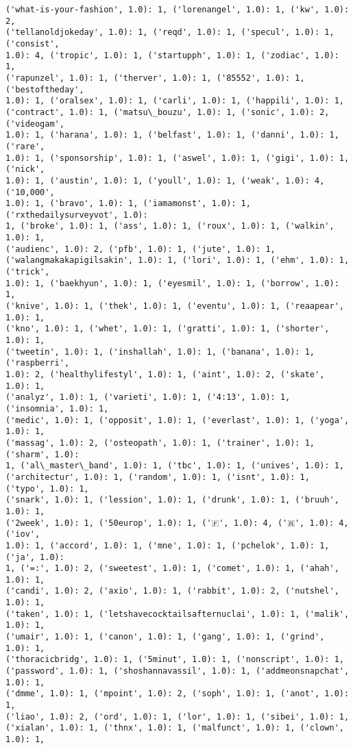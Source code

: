 \documentclass[11pt]{article}
\begin{document}
\begin{Verbatim}[commandchars=\\\{\}]
('what-is-your-fashion', 1.0): 1, ('lorenangel', 1.0): 1, ('kw', 1.0): 2,
('tellanoldjokeday', 1.0): 1, ('reqd', 1.0): 1, ('specul', 1.0): 1, ('consist',
1.0): 4, ('tropic', 1.0): 1, ('startupph', 1.0): 1, ('zodiac', 1.0): 1,
('rapunzel', 1.0): 1, ('therver', 1.0): 1, ('85552', 1.0): 1, ('bestoftheday',
1.0): 1, ('oralsex', 1.0): 1, ('carli', 1.0): 1, ('happili', 1.0): 1,
('contract', 1.0): 1, ('matsu\_bouzu', 1.0): 1, ('sonic', 1.0): 2, ('videogam',
1.0): 1, ('harana', 1.0): 1, ('belfast', 1.0): 1, ('danni', 1.0): 1, ('rare',
1.0): 1, ('sponsorship', 1.0): 1, ('aswel', 1.0): 1, ('gigi', 1.0): 1, ('nick',
1.0): 1, ('austin', 1.0): 1, ('youll', 1.0): 1, ('weak', 1.0): 4, ('10,000',
1.0): 1, ('bravo', 1.0): 1, ('iamamonst', 1.0): 1, ('rxthedailysurveyvot', 1.0):
1, ('broke', 1.0): 1, ('ass', 1.0): 1, ('roux', 1.0): 1, ('walkin', 1.0): 1,
('audienc', 1.0): 2, ('pfb', 1.0): 1, ('jute', 1.0): 1,
('walangmakakapigilsakin', 1.0): 1, ('lori', 1.0): 1, ('ehm', 1.0): 1, ('trick',
1.0): 1, ('baekhyun', 1.0): 1, ('eyesmil', 1.0): 1, ('borrow', 1.0): 1,
('knive', 1.0): 1, ('thek', 1.0): 1, ('eventu', 1.0): 1, ('reaapear', 1.0): 1,
('kno', 1.0): 1, ('whet', 1.0): 1, ('gratti', 1.0): 1, ('shorter', 1.0): 1,
('tweetin', 1.0): 1, ('inshallah', 1.0): 1, ('banana', 1.0): 1, ('raspberri',
1.0): 2, ('healthylifestyl', 1.0): 1, ('aint', 1.0): 2, ('skate', 1.0): 1,
('analyz', 1.0): 1, ('varieti', 1.0): 1, ('4:13', 1.0): 1, ('insomnia', 1.0): 1,
('medic', 1.0): 1, ('opposit', 1.0): 1, ('everlast', 1.0): 1, ('yoga', 1.0): 1,
('massag', 1.0): 2, ('osteopath', 1.0): 1, ('trainer', 1.0): 1, ('sharm', 1.0):
1, ('al\_master\_band', 1.0): 1, ('tbc', 1.0): 1, ('unives', 1.0): 1,
('architectur', 1.0): 1, ('random', 1.0): 1, ('isnt', 1.0): 1, ('typo', 1.0): 1,
('snark', 1.0): 1, ('lession', 1.0): 1, ('drunk', 1.0): 1, ('bruuh', 1.0): 1,
('2week', 1.0): 1, ('50europ', 1.0): 1, ('🇫', 1.0): 4, ('🇷', 1.0): 4, ('iov',
1.0): 1, ('accord', 1.0): 1, ('mne', 1.0): 1, ('pchelok', 1.0): 1, ('ja', 1.0):
1, ('=:', 1.0): 2, ('sweetest', 1.0): 1, ('comet', 1.0): 1, ('ahah', 1.0): 1,
('candi', 1.0): 2, ('axio', 1.0): 1, ('rabbit', 1.0): 2, ('nutshel', 1.0): 1,
('taken', 1.0): 1, ('letshavecocktailsafternuclai', 1.0): 1, ('malik', 1.0): 1,
('umair', 1.0): 1, ('canon', 1.0): 1, ('gang', 1.0): 1, ('grind', 1.0): 1,
('thoracicbridg', 1.0): 1, ('5minut', 1.0): 1, ('nonscript', 1.0): 1,
('password', 1.0): 1, ('shoshannavassil', 1.0): 1, ('addmeonsnapchat', 1.0): 1,
('dmme', 1.0): 1, ('mpoint', 1.0): 2, ('soph', 1.0): 1, ('anot', 1.0): 1,
('liao', 1.0): 2, ('ord', 1.0): 1, ('lor', 1.0): 1, ('sibei', 1.0): 1,
('xialan', 1.0): 1, ('thnx', 1.0): 1, ('malfunct', 1.0): 1, ('clown', 1.0): 1,

\end{Verbatim}
\end{document}
